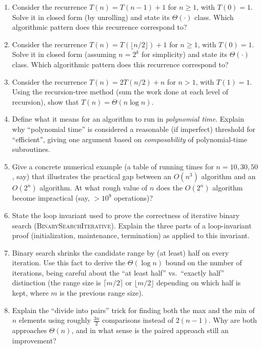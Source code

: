 \documentclass[11pt]{article}
\begin{document}
\begin{enumerate}[label=\textbf{A\arabic*.}, leftmargin=2.2em]
\item Consider the recurrence $T(n) = T(n-1) + 1$ for $n \ge 1$, with $T(0) = 1$. Solve it
in closed form (by unrolling) and state its $\Theta(\cdot)$ class. Which algorithmic
pattern does this recurrence correspond to?

\item Consider the recurrence $T(n) = T(\lfloor n/2 \rfloor) + 1$ for $n \ge 1$, with
$T(0)=1$. Solve it in closed form (assuming $n = 2^k$ for simplicity) and state its
$\Theta(\cdot)$ class. Which algorithmic pattern does this recurrence correspond to?

\item Consider the recurrence $T(n) = 2T(n/2) + n$ for $n > 1$, with $T(1) = 1$. Using the
recursion-tree method (sum the work done at each level of recursion), show that $T(n) =
\Theta(n \log n)$.

\item Define what it means for an algorithm to run in \emph{polynomial time}. Explain why
``polynomial time'' is considered a reasonable (if imperfect) threshold for ``efficient'',
giving one argument based on \emph{composability} of polynomial-time subroutines.

\item Give a concrete numerical example (a table of running times for $n=10, 30, 50$, say)
that illustrates the practical gap between an $O(n^3)$ algorithm and an $O(2^n)$
algorithm. At what rough value of $n$ does the $O(2^n)$ algorithm become impractical (say,
$> 10^9$ operations)?

\item State the loop invariant used to prove the correctness of iterative binary search
(\textsc{BinarySearchIterative}). Explain the three parts of a loop-invariant proof
(initialization, maintenance, termination) as applied to this invariant.

\item Binary search shrinks the candidate range by (at least) half on every iteration.
Use this fact to derive the $\Theta(\log n)$ bound on the number of iterations, being
careful about the ``at least half'' vs.\ ``exactly half'' distinction (the range size is
$\lceil m/2 \rceil$ or $\lfloor m/2 \rfloor$ depending on which half is kept, where $m$ is
the previous range size).

\item Explain the ``divide into pairs'' trick for finding both the max and the min of $n$
elements using roughly $\frac{3n}{2}$ comparisons instead of $2(n-1)$. Why are both
approaches $\Theta(n)$, and in what sense is the paired approach still an improvement?


\end{enumerate}
\end{document}
